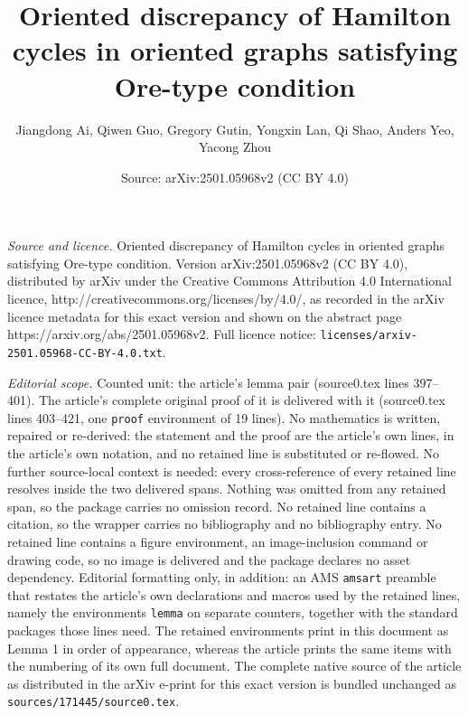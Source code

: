 \documentclass[10pt,a4paper]{amsart}
\title{Oriented discrepancy of Hamilton cycles in oriented graphs satisfying Ore-type condition}
\author{Jiangdong Ai, Qiwen Guo, Gregory Gutin, Yongxin Lan, Qi Shao, Anders Yeo, Yacong Zhou}
\date{Source: arXiv:2501.05968v2 (CC BY 4.0)}
\begin{document}
\maketitle

\noindent\emph{Source and licence.} Oriented discrepancy of Hamilton cycles in oriented graphs satisfying Ore-type condition. Version arXiv:2501.05968v2 (CC BY 4.0), distributed by arXiv under the Creative Commons Attribution 4.0 International licence, http://creativecommons.org/licenses/by/4.0/, as recorded in the arXiv licence metadata for this exact version and shown on the abstract page https://arxiv.org/abs/2501.05968v2. Full licence notice: \texttt{licenses/arxiv-2501.05968-CC-BY-4.0.txt}.\par\smallskip

\noindent\textit{Editorial scope.} Counted unit: the article's lemma pair (source0.tex lines 397--401). The article's complete original proof of it is delivered with it (source0.tex lines 403--421, one \texttt{proof} environment of 19 lines). No mathematics is written, repaired or re-derived: the statement and the proof are the article's own lines, in the article's own notation, and no retained line is substituted or re-flowed.  No further source-local context is needed: every cross-reference of every retained line resolves inside the two delivered spans.  Nothing was omitted from any retained span, so the package carries no omission record.  No retained line contains a citation, so the wrapper carries no bibliography and no bibliography entry.  No retained line contains a figure environment, an image-inclusion command or drawing code, so no image is delivered and the package declares no asset dependency.  Editorial formatting only, in addition: an AMS \texttt{amsart} preamble that restates the article's own declarations and macros used by the retained lines, namely the environments \texttt{lemma} on separate counters, together with the standard packages those lines need.  The retained environments print in this document as Lemma 1 in order of appearance, whereas the article prints the same items with the numbering of its own full document.  The complete native source of the article as distributed in the arXiv e-print for this exact version is bundled unchanged as \texttt{sources/171445/source0.tex}.
\end{document}
